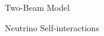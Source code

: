 \documentclass[9pt]{beamer}
\begin{document}
\begin{darkframes}
\begin{frame}{Two-Beam Model}
\end{frame}


%
%
%
%
%
%
%
%
%
%
%


\begin{frame}{Neutrino Self-interactions}



\end{frame}
\end{darkframes}
\end{document}

